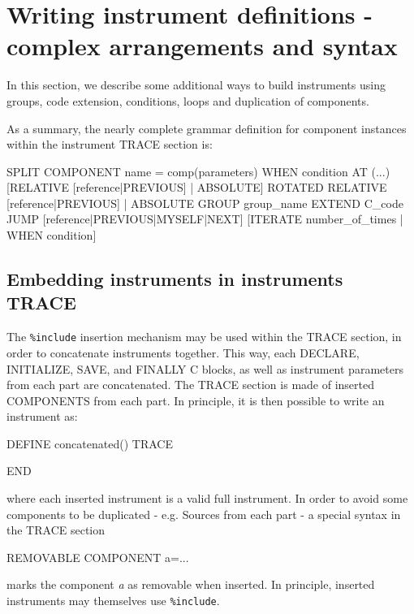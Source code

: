\section{Writing instrument definitions - complex arrangements and syntax}
\label{s:instrdefs-extend}

In this section, we describe some additional ways to build instruments using
groups, code extension, conditions, loops and duplication of components.

As a summary, the nearly complete grammar definition for component instances
within the instrument TRACE section is:

\begin{mcstas}
{SPLIT} COMPONENT name = comp(parameters) {WHEN condition}
  AT (...) [RELATIVE [reference|PREVIOUS] | ABSOLUTE]
  {ROTATED {RELATIVE [reference|PREVIOUS] | ABSOLUTE} }
  {GROUP group_name}
  {EXTEND C_code}
  {JUMP [reference|PREVIOUS|MYSELF|NEXT] [ITERATE number_of_times | WHEN condition] }
\end{mcstas}

\subsection{Embedding instruments in instruments TRACE}
\label{s:instrdefs-include-instr}
The \texttt{\%include} insertion mechanism may be used within the TRACE section,
in order to concatenate instruments together. This way, each DECLARE,
INITIALIZE, SAVE, and FINALLY C blocks, as well as instrument parameters from
each part are concatenated. The TRACE section is made of inserted COMPONENTS
from each part. In principle, it is then possible to write an instrument as:
\begin{mcstas}
DEFINE concatenated()
TRACE


END
\end{mcstas}
where each inserted instrument is a valid full instrument. In order to avoid
some components to be duplicated - e.g. Sources from each part - a special
syntax in the TRACE section
\begin{mcstas}
REMOVABLE COMPONENT a=...
\end{mcstas}
marks the component \textit{a} as removable when inserted. In principle, inserted
instruments may themselves use \texttt{\%include}.


